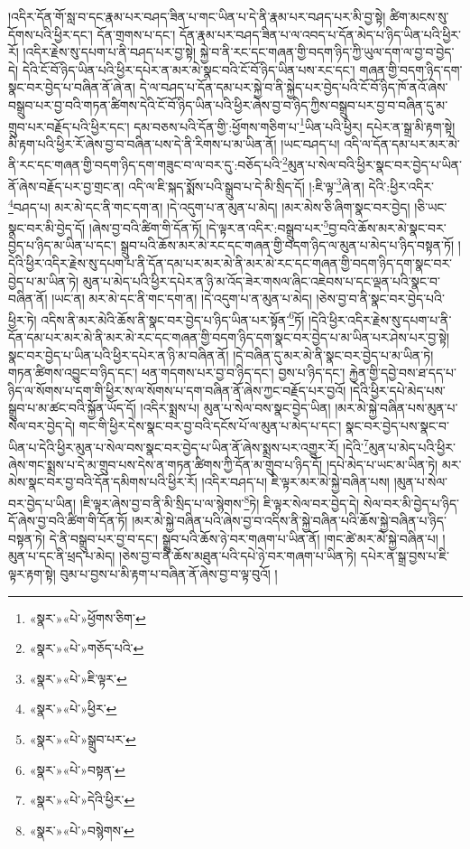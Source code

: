 །འདིར་དོན་གོ་སླ་བ་དང་རྣམ་པར་བཤད་ཟིན་པ་གང་ཡིན་པ་དེ་ནི་རྣམ་པར་བཤད་པར་མི་བྱ་སྟེ། ཚིག་མངས་སུ་དོགས་པའི་ཕྱིར་དང་། དོན་གྲགས་པ་དང་། དོན་རྣམ་པར་བཤད་ཟིན་པ་ལ་འབད་པ་དོན་མེད་པ་ཉིད་ཡིན་པའི་ཕྱིར་རོ། །འདིར་རྗེས་སུ་དཔག་པ་ནི་བཤད་པར་བྱ་སྟེ། སྐྱེ་བ་ནི་རང་དང་གཞན་གྱི་བདག་ཉིད་ཀྱི་ཡུལ་དག་ལ་བྱ་བ་བྱེད་དེ། དེའི་ངོ་བོ་ཉིད་ཡིན་པའི་ཕྱིར་དཔེར་ན་མར་མེ་སྣང་བའི་ངོ་བོ་ཉིད་ཡིན་པས་རང་དང་། གཞན་གྱི་བདག་ཉིད་དག་སྣང་བར་བྱེད་པ་བཞིན་ནོ་ཞེ་ན། དེ་ལ་བཤད་པ་དོན་དམ་པར་སྐྱེ་བ་ནི་སྐྱེད་པར་བྱེད་པའི་ངོ་བོ་ཉིད་ཁོ་ནའོ་ཞེས་བསྒྲུབ་པར་བྱ་བའི་གཏན་ཚིགས་དེའི་ངོ་བོ་ཉིད་ཡིན་པའི་ཕྱིར་ཞེས་བྱ་བ་ཉིད་ཀྱིས་བསྒྲུབ་པར་བྱ་བ་བཞིན་དུ་མ་གྲུབ་པར་བརྗོད་པའི་ཕྱིར་དང་། དམ་བཅས་པའི་དོན་གྱི་:ཕྱོགས་གཅིག་པ་\footnote{«སྣར་»«པེ་»ཕྱོགས་ཅིག་}ཡིན་པའི་ཕྱིར། དཔེར་ན་སྒྲ་མི་རྟག་སྟེ། མི་རྟག་པའི་ཕྱིར་རོ་ཞེས་བྱ་བ་བཞིན་པས་དེ་ནི་རིགས་པ་མ་ཡིན་ནོ། །ཡང་བཤད་པ། འདི་ལ་དོན་དམ་པར་མར་མེ་ནི་རང་དང་གཞན་གྱི་བདག་ཉིད་དག་གཟུང་བ་ལ་བར་དུ་:བཅོད་པའི་\footnote{«སྣར་»«པེ་»གཅོད་པའི་}མུན་པ་སེལ་བའི་ཕྱིར་སྣང་བར་བྱེད་པ་ཡིན་ནོ་ཞེས་བརྗོད་པར་བྱ་གྲང་ན། འདི་ལ་ཇི་སྐད་སྨོས་པའི་སྒྲུབ་པ་དེ་མི་སྲིད་དོ། །:ཇི་ལྟ་\footnote{«སྣར་»«པེ་»ཇི་ལྟར་}ཞེ་ན། དེའི་:ཕྱིར་འདིར་\footnote{«སྣར་»«པེ་»ཕྱིར་}བཤད་པ། མར་མེ་དང་ནི་གང་དག་ན། །དེ་འདུག་པ་ན་མུན་པ་མེད། །མར་མེས་ཅི་ཞིག་སྣང་བར་བྱེད། །ཅི་ཡང་སྣང་བར་མི་བྱེད་དོ། །ཞེས་བྱ་བའི་ཚིག་གི་དོན་ཏོ། །དེ་ལྟར་ན་འདིར་:བསྒྲུབ་པར་\footnote{«སྣར་»«པེ་»སྒྲུབ་པར་}བྱ་བའི་ཆོས་མར་མེ་སྣང་བར་བྱེད་པ་ཉིད་མ་ཡིན་པ་དང་། སྒྲུབ་པའི་ཆོས་མར་མེ་རང་དང་གཞན་གྱི་བདག་ཉིད་ལ་མུན་པ་མེད་པ་ཉིད་བསྟན་ཏོ། །དེའི་ཕྱིར་འདིར་རྗེས་སུ་དཔག་པ་ནི་དོན་དམ་པར་མར་མེ་ནི་མར་མེ་རང་དང་གཞན་གྱི་བདག་ཉིད་དག་སྣང་བར་བྱེད་པ་མ་ཡིན་ཏེ། མུན་པ་མེད་པའི་ཕྱིར་དཔེར་ན་ཉི་མ་འོད་ཟེར་གསལ་ཞིང་འཇེབས་པ་དང་ལྡན་པའི་སྣང་བ་བཞིན་ནོ། །ཡང་ན། མར་མེ་དང་ནི་གང་དག་ན། །དེ་འདུག་པ་ན་མུན་པ་མེད། །ཅེས་བྱ་བ་ནི་སྣང་བར་བྱེད་པའི་ཕྱིར་ཏེ། འདིས་ནི་མར་མེའི་ཆོས་ནི་སྣང་བར་བྱེད་པ་ཉིད་ཡིན་པར་སྟོན་\footnote{«སྣར་»«པེ་»བསྟན་}ཏོ། །དེའི་ཕྱིར་འདིར་རྗེས་སུ་དཔག་པ་ནི་དོན་དམ་པར་མར་མེ་ནི་མར་མེ་རང་དང་གཞན་གྱི་བདག་ཉིད་དག་སྣང་བར་བྱེད་པ་མ་ཡིན་པར་ཤེས་པར་བྱ་སྟེ། སྣང་བར་བྱེད་པ་ཡིན་པའི་ཕྱིར་དཔེར་ན་ཉི་མ་བཞིན་ནོ། །དེ་བཞིན་དུ་མར་མེ་ནི་སྣང་བར་བྱེད་པ་མ་ཡིན་ཏེ། གཏན་ཚིགས་འབྱུང་བ་ཉིད་དང་། ཕན་གདགས་པར་བྱ་བ་ཉིད་དང་། བྱས་པ་ཉིད་དང་། རྐྱེན་གྱི་དབྱེ་བས་ཐ་དད་པ་ཉིད་ལ་སོགས་པ་དག་གི་ཕྱིར་ས་ལ་སོགས་པ་དག་བཞིན་ནོ་ཞེས་ཀྱང་བརྗོད་པར་བྱའོ། །དེའི་ཕྱིར་དཔེ་མེད་པས་སྒྲུབ་པ་མ་ཚང་བའི་སྐྱོན་ཡོད་དོ། །འདིར་སྨྲས་པ། མུན་པ་སེལ་བས་སྣང་བྱེད་ཡིན། །མར་མེ་སྐྱེ་བཞིན་པས་མུན་པ་སེལ་བར་བྱེད་དེ། གང་གི་ཕྱིར་དེས་སྣང་བར་བྱ་བའི་དངོས་པོ་ལ་མུན་པ་མེད་པ་དང་། སྣང་བར་བྱེད་པས་སྣང་བ་ཡིན་པ་དེའི་ཕྱིར་མུན་པ་སེལ་བས་སྣང་བར་བྱེད་པ་ཡིན་ནོ་ཞེས་སྨྲས་པར་འགྱུར་རོ། །དེའི་\footnote{«སྣར་»«པེ་»དེའི་ཕྱིར་}མུན་པ་མེད་པའི་ཕྱིར་ཞེས་གང་སྨྲས་པ་དེ་མ་གྲུབ་པས་དེས་ན་གཏན་ཚིགས་ཀྱི་དོན་མ་གྲུབ་པ་ཉིད་དོ། །དཔེ་མེད་པ་ཡང་མ་ཡིན་ཏེ། མར་མེས་སྣང་བར་བྱ་བའི་དོན་དམིགས་པའི་ཕྱིར་རོ། །འདིར་བཤད་པ། ཇི་ལྟར་མར་མེ་སྐྱེ་བཞིན་པས། །མུན་པ་སེལ་བར་བྱེད་པ་ཡིན། །ཇི་ལྟར་ཞེས་བྱ་བ་ནི་མི་སྲིད་པ་ལ་སྙེགས་\footnote{«སྣར་»«པེ་»བསྙེགས་}ཏེ། ཇི་ལྟར་སེལ་བར་བྱེད་དེ། སེལ་བར་མི་བྱེད་པ་ཉིད་དོ་ཞེས་བྱ་བའི་ཚིག་གི་དོན་ཏོ། །མར་མེ་སྐྱེ་བཞིན་པའི་ཞེས་བྱ་བ་འདིས་ནི་སྐྱེ་བཞིན་པའི་ཆོས་སྐྱེ་བཞིན་པ་ཉིད་བསྟན་ཏེ། དེ་ནི་བསྒྲུབ་པར་བྱ་བ་དང་། སྒྲུབ་པའི་ཆོས་ཉེ་བར་གཞག་པ་ཡིན་ནོ། །གང་ཚེ་མར་མེ་སྐྱེ་བཞིན་པ། །མུན་པ་དང་ནི་ཕྲད་པ་མེད། །ཅེས་བྱ་བ་ནི་ཆོས་མཐུན་པའི་དཔེ་ཉེ་བར་གཞག་པ་ཡིན་ཏེ། དཔེར་ན་སྒྲ་བྱས་པ་ཇི་ལྟར་རྟག་སྟེ། བུམ་པ་བྱས་པ་མི་རྟག་པ་བཞིན་ནོ་ཞེས་བྱ་བ་ལྟ་བུའོ། །
